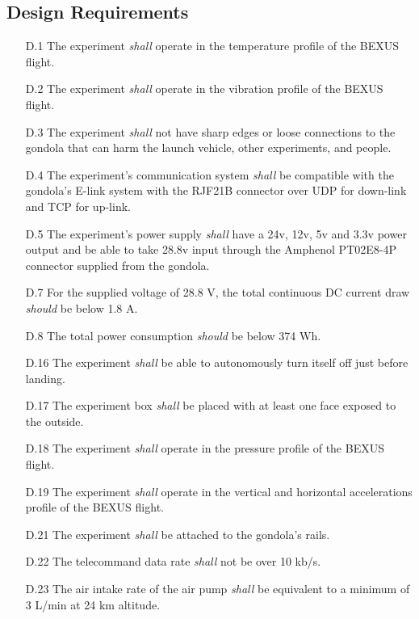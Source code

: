 \documentclass[a4paper,12pt,oneside]{article}
\begin{document}
\subsection{Design Requirements}

\begin{enumerate}
    \item[D.1] The experiment \textit{shall} operate in the temperature profile of the BEXUS flight\cite{BexusManual}.
    \item[D.2] The experiment \textit{shall} operate in the vibration profile of the BEXUS flight\cite{BexusManual}.
    \item[D.3] The experiment \textit{shall} not have sharp edges or loose connections to the gondola that can harm the launch vehicle, other experiments, and people.%
    \item[D.4] The experiment's communication system \textit{shall} be compatible with the gondola's E-link system with the RJF21B connector over UDP for down-link and TCP for up-link.
    \item[D.5] The experiment's power supply \textit{shall} have a 24v, 12v, 5v and 3.3v power output and be able to take 28.8v input through the Amphenol PT02E8-4P connector supplied from the gondola. 
    \item[D.7] For the supplied voltage of 28.8 V, the total continuous DC current draw \textit{should} be below 1.8 A.
    \item[D.8] The total power consumption \textit{should} be below 374 Wh.
    \item[D.16] The experiment \textit{shall} be able to autonomously turn itself off just before landing.
    \item[D.17] The experiment box \textit{shall} be placed with at least one face exposed to the outside.
    \item[D.18] The experiment \textit{shall} operate in the pressure profile of the BEXUS flight\cite{BexusManual}.
    \item[D.19] The experiment \textit{shall} operate in the vertical and horizontal accelerations profile of the BEXUS flight\cite{BexusManual}.
    \item[D.21] The experiment \textit{shall} be attached to the gondola's rails.
    \item[D.22] The telecommand data rate \textit{shall} not be over 10 kb/s.
    \item[D.23] The air intake rate of the air pump \textit{shall} be equivalent to a minimum of 3 L/min at 24 km altitude.

\end{enumerate}
\end{document}
